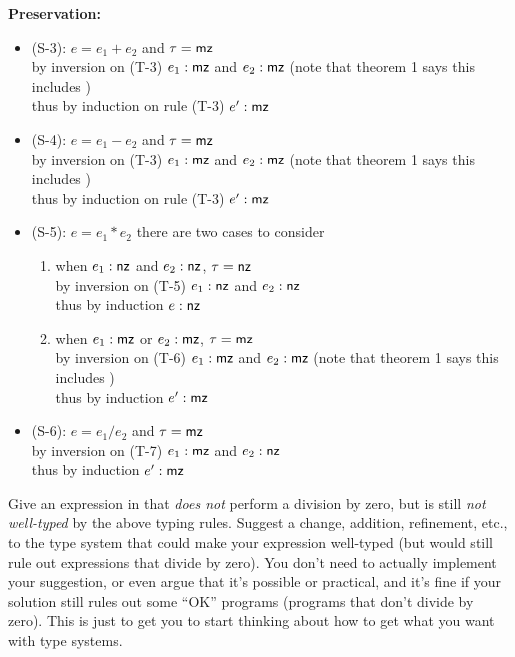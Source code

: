 \documentclass{article}
\begin{document}
\textbf{Preservation:}
\begin{itemize}
    \item (S-3): $e = e_1 + e_2$ and $\tau = \mathsf{mz}$\\
        by inversion on (T-3) $e_1 : \mathsf{mz}$ and $e_2 : \mathsf{mz}$
        (note that theorem 1 says this includes \kwnz)\\
        thus by induction on rule (T-3) $e' : \mathsf{mz}$
    \item (S-4): $e = e_1 - e_2$ and $\tau = \mathsf{mz}$\\
        by inversion on (T-3) $e_1 : \mathsf{mz}$ and $e_2 : \mathsf{mz}$
        (note that theorem 1 says this includes \kwnz)\\
        thus by induction on rule (T-3) $e' : \mathsf{mz}$
    \item (S-5): $e = e_1 * e_2$
        there are two cases to consider
        \begin{enumerate}
            \item when $e_1 : \mathsf{nz}$ and $e_2 : \mathsf{nz}$, $\tau = \mathsf{nz}$\\
                by inversion on (T-5) $e_1 : \mathsf{nz}$ and $e_2 : \mathsf{nz}$\\
                thus by induction $e : \mathsf{nz}$
            \item when $e_1 : \mathsf{mz}$ or $e_2 : \mathsf{mz}$, $\tau = \mathsf{mz}$\\
                by inversion on (T-6) $e_1 : \mathsf{mz}$ and $e_2 : \mathsf{mz}$ 
                (note that theorem 1 says this includes \kwnz)\\
                thus by induction $e' : \mathsf{mz}$
        \end{enumerate}
    \item (S-6): $e = e_1 / e_2$ and $\tau = \mathsf{mz}$\\
        by inversion on (T-7) $e_1 : \mathsf{mz}$ and $e_2 : \mathsf{nz}$\\
        thus by induction $e' : \mathsf{mz}$
\end{itemize}


\begin{task}
  Give an expression in {\ezlang} that {\em does not} perform a division by
  zero, but is still {\em not well-typed} by the above typing rules.
  Suggest a change, addition, refinement, etc., to the type system that could
  make your expression well-typed (but would still rule out expressions that
  divide by zero).
  You don't need to actually implement your suggestion, or even argue that
  it's possible or practical, and it's fine if your solution still rules out
  some ``OK'' programs (programs that don't divide by zero).
  This is just to get you to start thinking about
  how to get what you want with type systems.
\end{task}
\end{document}

